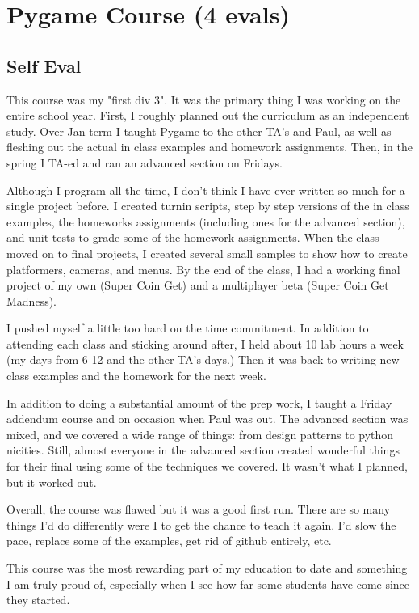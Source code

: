 \section{Pygame Course (4 evals)}

\begin{meta}
\end{meta}

\subsection*{Self Eval}
This course was my "first div 3". It was the primary thing I was working
on the entire school year. First, I roughly planned out the curriculum
as an independent study. Over Jan term I taught Pygame to the other
TA's and Paul, as well as fleshing out the actual in class examples and
homework assignments. Then, in the spring I TA-ed and ran an advanced
section on Fridays.

Although I program all the time, I don't think I have ever written
so much for a single project before. I created turnin scripts, step
by step versions of the in class examples, the homeworks assignments
(including ones for the advanced section), and unit tests to grade some
of the homework assignments. When the class moved on to final projects,
I created several small samples to show how to create platformers,
cameras, and menus. By the end of the class, I had a working final
project of my own (Super Coin Get) and a multiplayer beta (Super Coin
Get Madness).

I pushed myself a little too hard on the time commitment. In addition
to attending each class and sticking around after, I held about 10 lab
hours a week (my days from 6-12 and the other TA's days.) Then it was
back to writing new class examples and the homework for the next week.

In addition to doing a substantial amount of the prep work, I taught a
Friday addendum course and on occasion when Paul was out. The advanced
section was mixed, and we covered a wide range of things: from design
patterns to python nicities. Still, almost everyone in the advanced
section created wonderful things for their final using some of the
techniques we covered. It wasn't what I planned, but it worked out.

Overall, the course was flawed but it was a good first run. There are
so many things I'd do differently were I to get the chance to teach
it again. I'd slow the pace, replace some of the examples, get rid of
github entirely, etc.

This course was the most rewarding part of my education to date and
something I am truly proud of, especially when I see how far some
students have come since they started.



